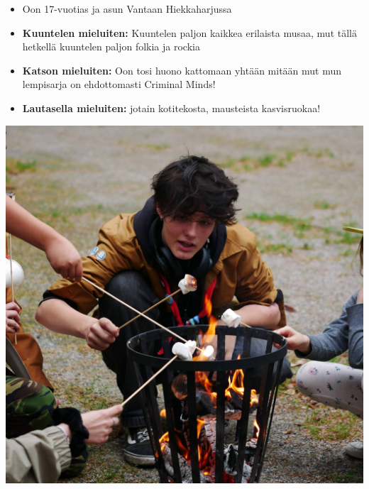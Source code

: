 \begin{FaktaLaatikko}[Leo]

\begin{multicols}{2}
\vspace*{-0.64cm}
\vspace*{-0.16cm}
\begin{itemize}
\item Oon 17-vuotias ja asun Vantaan Hiekkaharjussa
\item \textbf{Kuuntelen mieluiten:} Kuuntelen paljon kaikkea erilaista musaa, mut tällä hetkellä kuuntelen paljon folkia ja rockia
\item \textbf{Katson mieluiten:} Oon tosi huono kattomaan yhtään mitään mut mun lempisarja on ehdottomasti Criminal Minds!
\item \textbf{Lautasella mieluiten:} jotain kotitekosta, mausteista kasvisruokaa!
\end{itemize}
\columnbreak

\includegraphics[width=1.02\columnwidth]{assets/johtajarusakot-leo.jpg}
\end{multicols}

\end{FaktaLaatikko}
\vspace*{-0.64cm}
